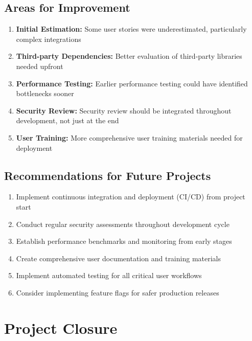 \documentclass[12pt,a4paper]{article}
\begin{document}
\subsection{Areas for Improvement}
\begin{enumerate}
    \item \textbf{Initial Estimation:} Some user stories were underestimated, particularly complex integrations
    \item \textbf{Third-party Dependencies:} Better evaluation of third-party libraries needed upfront
    \item \textbf{Performance Testing:} Earlier performance testing could have identified bottlenecks sooner
    \item \textbf{Security Review:} Security review should be integrated throughout development, not just at the end
    \item \textbf{User Training:} More comprehensive user training materials needed for deployment
\end{enumerate}

\subsection{Recommendations for Future Projects}
\begin{enumerate}
    \item Implement continuous integration and deployment (CI/CD) from project start
    \item Conduct regular security assessments throughout development cycle
    \item Establish performance benchmarks and monitoring from early stages
    \item Create comprehensive user documentation and training materials
    \item Implement automated testing for all critical user workflows
    \item Consider implementing feature flags for safer production releases
\end{enumerate}

\section{Project Closure}
\end{document}
